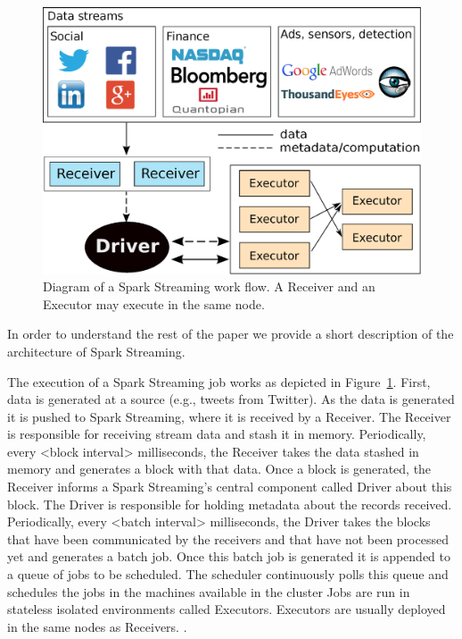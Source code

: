 
\begin{figure}[t!]
  \begin{center}
    \includegraphics[scale=0.30]{images_graphs/spark_architecture_v4.eps}
  \end{center}
  \caption{Diagram of a Spark Streaming work flow. A Receiver and an Executor may execute in the same node.}
  \label{fig:SparkStreaming_architecture}
\end{figure}

In order to understand the rest of the paper we provide a short description of the architecture of Spark Streaming.

The execution of a Spark Streaming job works as depicted in Figure~\ref{fig:SparkStreaming_architecture}. 
First, data is generated at a source (e.g., tweets from Twitter). As the data is generated it is pushed to Spark Streaming, where it is received by a Receiver. 
The Receiver is responsible for receiving stream data and stash it in memory. Periodically, every <block interval> milliseconds, the Receiver takes the data stashed in memory and generates a block with that data. 
Once a block is generated, the Receiver informs a Spark Streaming's central component called Driver about this block. The Driver is responsible for holding metadata about the records received. 
Periodically, every <batch interval> milliseconds, the Driver takes the blocks that have been communicated by the receivers and that have not been processed yet and generates a batch job. 
Once this batch job is generated it is appended to a queue of jobs to be scheduled. 
The scheduler continuously polls this queue and schedules the jobs in the machines available in the cluster
Jobs are run in stateless isolated environments called Executors. Executors are usually deployed in the same nodes as Receivers.  .


